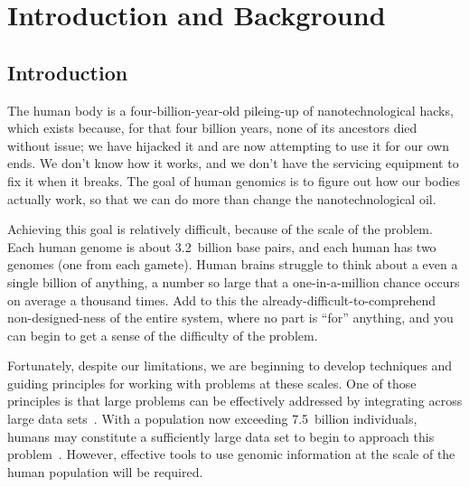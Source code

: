 \chapter{Introduction and Background}

\section{Introduction}

The human body is a four-billion-year-old pileing-up of nanotechnological hacks, which exists because, for that four billion years, none of its ancestors died without issue; we have hijacked it and are now attempting to use it for our own ends. We don't know how it works, and we don't have the servicing equipment to fix it when it breaks. The goal of human genomics is to figure out how our bodies actually work, so that we can do more than change the nanotechnological oil.

Achieving this goal is relatively difficult, because of the scale of the problem. Each human genome is about 3.2~billion base pairs, and each human has two genomes (one from each gamete). %
Human brains struggle to think about a even a single billion of anything, a number so large that a one-in-a-million chance occurs on average a thousand times. Add to this the already-difficult-to-comprehend non-designed-ness of the entire system, where no part is ``for'' anything, and you can begin to get a sense of the difficulty of the problem.

Fortunately, despite our limitations, we are beginning to develop techniques and guiding principles for working with problems at these scales. One of those principles is that large problems can be effectively addressed by integrating across large data sets~\cite{halevy2009unreasonable}. With a population now exceeding 7.5~billion individuals, humans may constitute a sufficiently large data set to begin to approach this problem~\cite{talton2017economics}. However, effective tools to use genomic information at the scale of the human population will be required.

